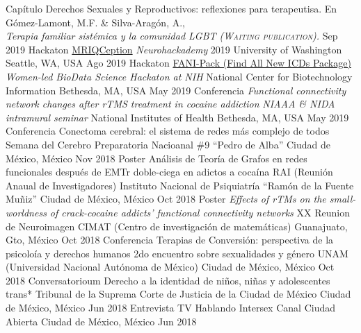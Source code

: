 \begin{cvproceedings}
    \cvproceeding
        {Capítulo}
        {Derechos Sexuales y Reproductivos: reflexiones para terapeutisa. En Gómez-Lamont, M.F. \& Silva-Aragón, A., \\\slshape{\color{awesome}Terapia familiar sistémica y la comunidad LGBT} (\scshape{Waiting publication}).}
        {}
        {}
        {}
        {Sep 2019}
    \cvproceeding
        {Hackaton}
        {\href{https://github.com/elizabethbeard/mriqception}{MRIQCeption}}
        {\textit{Neurohackademy} 2019}
        {University of Washington}
        {Seattle, WA, USA}
        {Ago 2019}
    \cvproceeding
        {Hackaton}
        {\href{https://github.com/NCBI-Hackathons/Design-of-ICD-9-to-10-conversion-function-for-the-R-package-icd}{FANI-Pack (Find All New ICDs Package)}}
        {\textit{Women-led BioData Science Hackaton at NIH}}
        {National Center for Biotechnology Information}
        {Bethesda, MA, USA}
        {May 2019}
    \cvproceeding
        {Conferencia}
        {\textit{Functional connectivity network changes after rTMS treatment in cocaine addiction}}
        {\textit{NIAAA \& NIDA intramural seminar}}
        {National Institutes of Health}
        {Bethesda, MA, USA}
        {May 2019}
    \cvproceeding
        {Conferencia}
        {Conectoma cerebral: el sistema de redes más complejo de todos}
        {Semana del Cerebro}
        {Preparatoria Nacioanal \#9 ``Pedro de Alba''}
        {Ciudad de México, México}
        {Nov 2018}
    \cvproceeding
        {Poster}
        {Análisis de Teoría de Grafos en redes funcionales después de EMTr doble-ciega en adictos a cocaína}
        {RAI (Reunión Anaual de Investigadores)}
        {Instituto Nacional de Psiquiatría ``Ramón de la Fuente Muñiz''}
        {Ciudad de México, México}
        {Oct 2018}
    \cvproceeding
        {Poster}
        {\textit{Effects of rTMs on the small-worldness of crack-cocaine addicts' functional connectivity networks}}
        {XX Reunion de Neuroimagen}
        {CIMAT (Centro de investigación de matemáticas)}
        {Guanajuato, Gto, México}
        {Oct 2018}
    \cvproceeding
        {Conferencia}
        {Terapias de Conversión: perspectiva de la psicoloía y derechos humanos}
        {2do encuentro sobre sexualidades y género}
        {UNAM (Universidad Nacional Autónoma de México)}
        {Ciudad de México, México}
        {Oct 2018}
    \cvproceeding
        {Conversatorioum}
        {Derecho a la identidad de niños, niñas y adolescentes trans*}
        {}
        {Tribunal de la Suprema Corte de Justicia de la Ciudad de México}
        {Ciudad de México, México}
        {Jun 2018}
    \cvproceeding
        {Entrevista TV}
        {Hablando Intersex}
        {}
        {Canal Ciudad Abierta}
        {Ciudad de México, México}
        {Jun 2018}
\end{cvproceedings}
